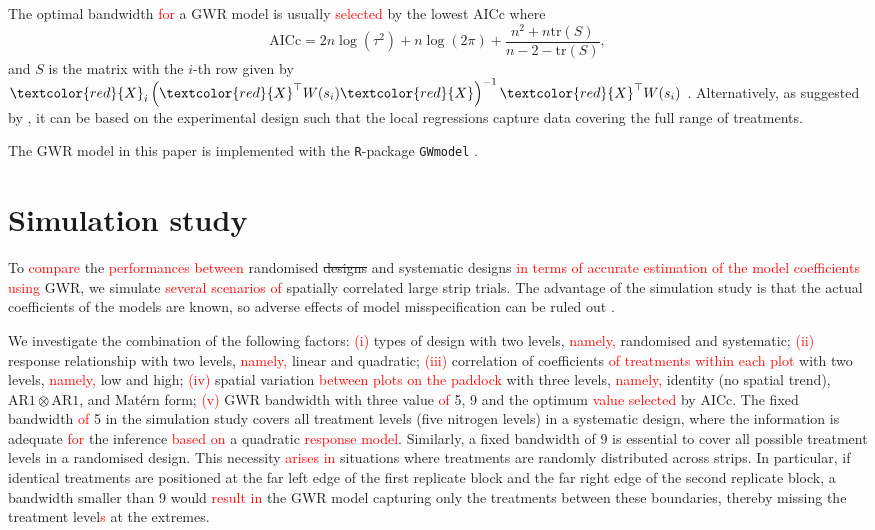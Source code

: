 \documentclass[a4paper]{article} 	%
\newcommand{\tr}{\mathrm{tr}}
\newcommand{\R}{\texttt{R}}
\newcommand{\Matern}{Mat\'ern }
\newcommand{\AR}{\mathrm{AR1}}
\newcommand{\revision}[1]{\textcolor{red}{#1}}
\begin{document}
The optimal bandwidth \revision{for} a GWR model is usually \revision{selected} by the lowest AICc where 
\begin{equation}\label{eq:aicc}
	\mbox{AICc} = 2n\log (\tau^2) + n \log (2\pi) + \frac{n^2+n\tr (S)}{n-2-\tr (S)},
\end{equation}
and $S$ is the matrix with the $i$-th row given by $\revision{X}_i\left( \revision{X}^\top W(s_i) \revision{X} \right)^{-1}\revision{X}^\top W(s_i)$ \parencite{Evans2020Assessment}. Alternatively, as suggested by \textcite{Rakshit2020Novel}, it can be based on the experimental design such that the local regressions capture data covering the full range of treatments.

The GWR model in this paper is implemented with the \R-package \texttt{GWmodel} \parencite{lu2014gwmodel, Gollini2015GWmodel}. 


\section{Simulation study}\label{Sec:Simu}

To \revision{compare} the \revision{performances between} randomised \st{designs} and systematic designs \revision{in terms of accurate estimation of the model coefficients} \revision{using} GWR, we simulate \revision{several scenarios of} spatially correlated large strip trials. The advantage of the simulation study is that the actual coefficients of the models are known, so adverse effects of model misspecification can be ruled out \parencite{Piepho2013Why}. 

We investigate the combination of the following factors: \revision{(i)} types of design with two levels, \revision{namely,} randomised and systematic; \revision{(ii)} response relationship with two levels, \revision{namely,} linear and quadratic; \revision{(iii)} correlation of coefficients \revision{of treatments within each plot} with two levels, \revision{namely,} low and high; \revision{(iv)} spatial variation \revision{between plots on the paddock} with three levels, \revision{namely,} identity (no spatial trend), $\AR\otimes\AR$, and \Matern form; \revision{(v)} GWR bandwidth with three value \revision{of} 5, 9 and the optimum \revision{value selected} by AICc. The fixed bandwidth \revision{of} 5 in the simulation study covers all treatment levels (five nitrogen levels) in a systematic design, where the information is adequate \revision{for} the inference \revision{based on} a quadratic \revision{response model}. Similarly, a fixed bandwidth of 9 is essential to cover all possible treatment levels in a randomised design. This necessity \revision{arises in} situations where treatments are randomly distributed across strips. In particular, if identical treatments are positioned at the far left edge of the first replicate block and the far right edge of the second replicate block, a bandwidth smaller than 9 would  \revision{result in} the GWR model capturing only the treatments between these boundaries, thereby missing the treatment level\revision{s} at the extremes.
\end{document}
